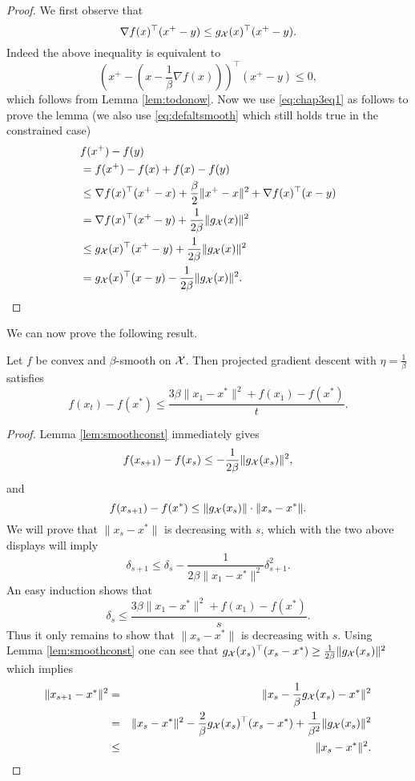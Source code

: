 \begin{proof}
We first observe that 
\begin{equation} \label{eq:chap3eq1}
\nabla f(x)^{\top} (x^+ - y) \leq g_{\mathcal{X}}(x)^{\top}(x^+ - y) .
\end{equation}
Indeed the above inequality is equivalent to
$$\left(x^+- \left(x - \frac{1}{\beta} \nabla f(x) \right)\right)^{\top} (x^+ - y) \leq 0, $$
which follows from Lemma \ref{lem:todonow}. Now we use \eqref{eq:chap3eq1} as follows to prove the lemma (we also use \eqref{eq:defaltsmooth} which still holds true in the constrained case)
\begin{align*}
& f(x^+) - f(y) \\
& = f(x^+) - f(x) + f(x) - f(y) \\
& \leq \nabla f(x)^{\top} (x^+-x) + \frac{\beta}{2} \|x^+-x\|^2 + \nabla f(x)^{\top} (x-y) \\
& = \nabla f(x)^{\top} (x^+ - y) + \frac{1}{2 \beta} \|g_{\mathcal{X}}(x)\|^2 \\
& \leq g_{\mathcal{X}}(x)^{\top}(x^+ - y) + \frac{1}{2 \beta} \|g_{\mathcal{X}}(x)\|^2 \\
& = g_{\mathcal{X}}(x)^{\top}(x - y) - \frac{1}{2 \beta} \|g_{\mathcal{X}}(x)\|^2 .
\end{align*}
\end{proof}
We can now prove the following result.
\begin{theorem} \label{th:gdsmoothconstrained}
Let $f$ be convex and $\beta$-smooth on $\mathcal{X}$. Then projected gradient descent with $\eta = \frac{1}{\beta}$ satisfies
$$f(x_t) - f(x^*) \leq \frac{3 \beta \|x_1 - x^*\|^2 + f(x_1) - f(x^*)}{t} .$$
\end{theorem}

\begin{proof}
Lemma \ref{lem:smoothconst} immediately gives
$$f(x_{s+1}) - f(x_s) \leq - \frac{1}{2 \beta} \|g_{\mathcal{X}}(x_s)\|^2 ,$$
and
$$f(x_{s+1}) - f(x^*) \leq \|g_{\mathcal{X}}(x_s)\| \cdot \|x_s - x^*\| .$$
We will prove that $\|x_s - x^*\|$ is decreasing with $s$, which with the two above displays will imply
$$\delta_{s+1} \leq \delta_s  - \frac{1}{2 \beta \|x_1 - x^*\|^2} \delta_{s+1}^2.$$
An easy induction shows that
$$\delta_s \leq \frac{3 \beta \|x_1 - x^*\|^2 + f(x_1) - f(x^*)}{s}.$$
Thus it only remains to show that $\|x_s - x^*\|$ is decreasing with $s$. Using Lemma \ref{lem:smoothconst} one can see that $g_{\mathcal{X}}(x_s)^{\top} (x_s - x^*) \geq \frac{1}{2 \beta} \|g_{\mathcal{X}}(x_s)\|^2$ which implies
\begin{eqnarray*}
\|x_{s+1} - x^*\|^2& = & \|x_{s} - \frac{1}{\beta} g_{\mathcal{X}}(x_s) - x^*\|^2 \\
& = & \|x_{s} - x^*\|^2 - \frac{2}{\beta} g_{\mathcal{X}}(x_s)^{\top} (x_s - x^*) + \frac{1}{\beta^2} \|g_{\mathcal{X}}(x_s)\|^2 \\
& \leq & \|x_{s} - x^*\|^2 .
\end{eqnarray*}
\end{proof}

